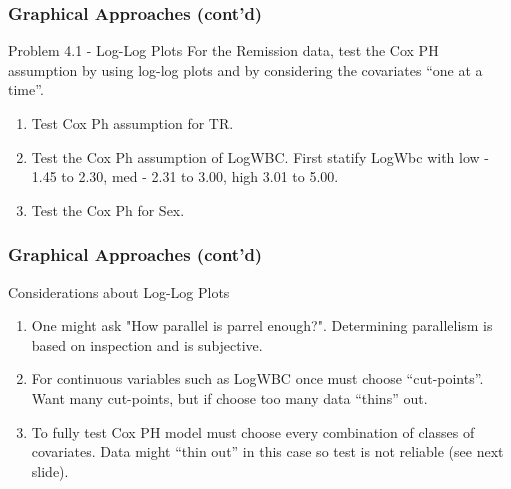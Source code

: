 \documentclass{beamer}
\theoremstyle{definition}
\begin{document}
\begin{frame}
\frametitle{Graphical Approaches (cont'd)}
\begin{block}{Problem 4.1 - Log-Log Plots}
For the Remission data, test the Cox PH assumption by using log-log plots and by considering the covariates ``one at a time''.
\begin{enumerate}
\item Test Cox Ph assumption for TR.
\item Test the Cox Ph assumption of LogWBC. First statify LogWbc with low - 1.45 to 2.30, med - 2.31 to 3.00, high 3.01 to 5.00.
\item Test the Cox Ph for Sex.
\end{enumerate}
\end{block}
\end{frame}

\begin{frame}
\frametitle{Graphical Approaches (cont'd)}
\begin{block}{Considerations about Log-Log Plots}
\begin{enumerate}
\item  One might ask "How parallel is parrel enough?". Determining parallelism is based on inspection and is subjective.
\item  For continuous variables such as LogWBC once must choose ``cut-points''. Want many cut-points, but if choose too many data ``thins'' out.
\item  To fully test Cox PH model must choose every combination of classes of covariates. Data might ``thin out'' in this case so test is not reliable (see next slide).
\end{enumerate}
\end{block}
\end{frame}
\end{document}
